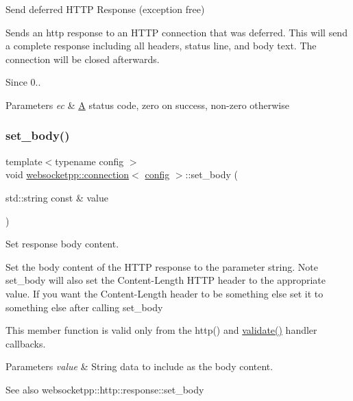 Send deferred H\+T\+TP Response (exception free) 

Sends an http response to an H\+T\+TP connection that was deferred. This will send a complete response including all headers, status line, and body text. The connection will be closed afterwards.

\begin{DoxySince}{Since}
0..
\end{DoxySince}

\begin{DoxyParams}{Parameters}
{\em ec} & \mbox{\hyperlink{struct_a}{A}} status code, zero on success, non-\/zero otherwise \\
\hline
\end{DoxyParams}
\mbox{\label{classwebsocketpp_1_1connection_a40bb318c3b9294018d217d0271a7b3da}} 
\subsubsection{\texorpdfstring{set\+\_\+body()}{set\_body()}}
{\footnotesize\ttfamily template$<$typename config $>$ \\
void \mbox{\hyperlink{classwebsocketpp_1_1connection}{websocketpp\+::connection}}$<$ \mbox{\hyperlink{classconfig}{config}} $>$\+::set\+\_\+body (\begin{DoxyParamCaption}\item[{std\+::string const \&}]{value }\end{DoxyParamCaption})}



Set response body content. 

Set the body content of the H\+T\+TP response to the parameter string. Note set\+\_\+body will also set the Content-\/\+Length H\+T\+TP header to the appropriate value. If you want the Content-\/\+Length header to be something else set it to something else after calling set\+\_\+body

This member function is valid only from the http() and \mbox{\hyperlink{authority_8hpp_a98696231ed7d6f1c166797053cebc5eb}{validate()}} handler callbacks.


\begin{DoxyParams}{Parameters}
{\em value} & String data to include as the body content. \\
\hline
\end{DoxyParams}
\begin{DoxySeeAlso}{See also}
websocketpp\+::http\+::response\+::set\+\_\+body 
\end{DoxySeeAlso}
\mbox{\label{classwebsocketpp_1_1connection_a25fb7096431b1d7350c34035db7ed9a4}} 
